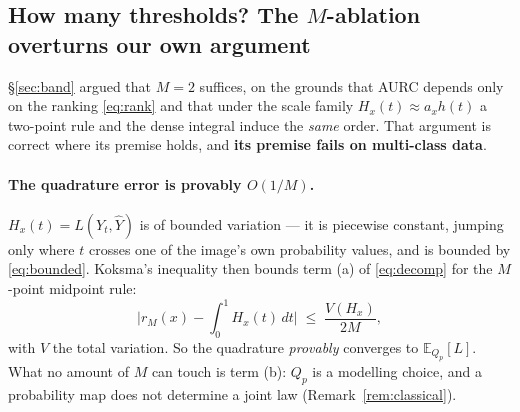 \documentclass[11pt]{article}
\theoremstyle{remark}
\newcommand{\Yhat}{\widehat{Y}}
\newcommand{\Ex}{\mathbb{E}}
\begin{document}
\subsection{How many thresholds? The $M$-ablation overturns our own argument}\label{sec:quadrature}

\S\ref{sec:band} argued that $M=2$ suffices, on the grounds that AURC depends only on
the ranking \eqref{eq:rank} and that under the scale family $H_x(t)\approx a_x h(t)$
a two-point rule and the dense integral induce the \emph{same} order. That argument
is correct where its premise holds, and \textbf{its premise fails on multi-class
data}.

\paragraph{The quadrature error is provably $O(1/M)$.} $H_x(t)=L(Y_t,\Yhat)$ is of
bounded variation --- it is piecewise constant, jumping only where $t$ crosses one of
the image's own probability values, and is bounded by \eqref{eq:bounded}. Koksma's
inequality then bounds term (a) of \eqref{eq:decomp} for the $M$-point midpoint rule:
\begin{equation}\label{eq:koksma}
\Big| r_M(x) - \int_0^1 H_x(t)\,dt \Big| \;\le\; \frac{V(H_x)}{2M},
\end{equation}
with $V$ the total variation. So the quadrature \emph{provably} converges to
$\Ex_{Q_p}[L]$. What no amount of $M$ can touch is term (b): $Q_p$ is a modelling
choice, and a probability map does not determine a joint law
(Remark~\ref{rem:classical}).
\end{document}
